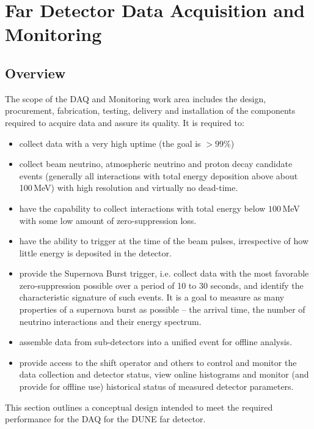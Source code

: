 \section{Far Detector Data Acquisition and Monitoring}
\label{sec:daq}

\subsection{Overview}

The scope of the DAQ and Monitoring work area includes the design, procurement, fabrication, testing, delivery and installation of the components required to acquire data and assure its quality.
It is required to:
\begin{itemize}
\item collect data with a very high uptime (the goal is $>99\%$)

\item collect beam neutrino, atmospheric neutrino and proton  decay candidate events (generally all interactions
with total energy deposition above about 100\,MeV) with high resolution and virtually no dead-time.

\item have the capability to collect interactions with total energy  below $100$\,MeV with some
 low amount of zero-suppression loss.

\item have the ability to trigger at the time of the beam pulses,  irrespective of how little energy is deposited in the detector.

\item provide the Supernova Burst trigger, i.e. collect data with the most favorable zero-suppression possible over a  period of 10 to 30 seconds,
and identify the characteristic signature of such events.  It is a goal to measure as many properties
of a supernova burst as possible -- the arrival time, the 
number of neutrino interactions and their energy spectrum.

\item assemble data from sub-detectors into a unified  event for offline analysis.
\item provide access to the shift operator and others to control and   monitor the data collection and detector status, view online
  histograms and monitor (and provide for offline use) historical  status of measured detector parameters. 

\end{itemize}
\noindent
This section outlines a conceptual design intended to meet the required performance for the DAQ
for the DUNE far detector. 


